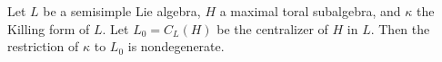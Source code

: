 Let $L$ be a semisimple Lie algebra, $H$ a maximal toral subalgebra, and $\kappa$ the Killing form of $L$. Let $L_0 = C_L(H)$ be the centralizer of $H$ in $L$. Then the restriction of $\kappa$ to $L_0$ is nondegenerate.
